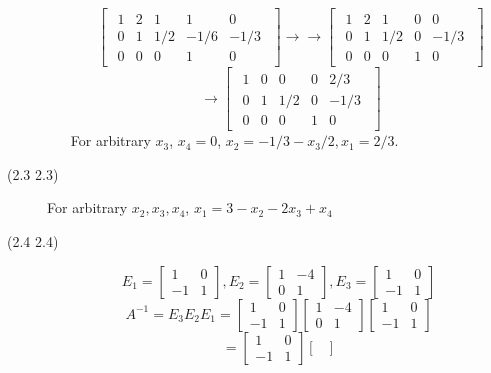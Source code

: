 \begin{description}
\begin{itemize}
$$\begin{bmatrix}
\begin{array}{cccc|c}
1 & 2 & 1 & 1 & 0 \\
0 & 1 & 1/2 & -1/6 & -1/3 \\
0 & 0 & 0 & 1 & 0
\end{array}
\end{bmatrix}\rightarrow\rightarrow \begin{bmatrix}
\begin{array}{cccc|c}
1 & 2 & 1 & 0 & 0 \\
0 & 1 & 1/2 & 0 & -1/3 \\
0 & 0 & 0 & 1 & 0
\end{array}
\end{bmatrix}$$
$$\rightarrow \begin{bmatrix}
\begin{array}{cccc|c}
1 & 0 & 0 & 0 & 2/3 \\
0 & 1 & 1/2 & 0 & -1/3 \\
0 & 0 & 0 & 1 & 0
\end{array}
\end{bmatrix}$$
For arbitrary $x_3$, $x_4 = 0$, $x_2 = -1/3 - x_3/2, x_1 = 2/3$.
\end{itemize}
\item[(2.3 {\color{cBlue}2.3})]
For arbitrary $x_2, x_3, x_4$, $x_1 = 3 - x_2 - 2x_3 + x_4$
\item[(2.4 {\color{cBlue}2.4})]
$$E_1 = \begin{bmatrix}
1 & 0 \\
-1 & 1
\end{bmatrix}, E_2 = \begin{bmatrix}
1 & -4 \\
0 & 1
\end{bmatrix}, E_3 = \begin{bmatrix}
1 & 0 \\
-1 & 1
\end{bmatrix}$$
$$A^{-1} = E_3E_2E_1 = \begin{bmatrix}
1 & 0 \\
-1 & 1
\end{bmatrix}\begin{bmatrix}
1 & -4 \\
0 & 1
\end{bmatrix}\begin{bmatrix}
1 & 0 \\
-1 & 1
\end{bmatrix}$$
$$= \begin{bmatrix}
1 & 0 \\
-1 & 1
\end{bmatrix}\begin{bmatrix}

\end{bmatrix}$$
\end{description}

